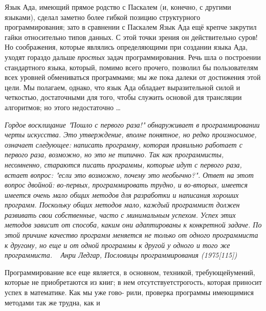 Язык Ада, имеющий прямое родство с Паскалем (и, конечно, с другими языками), сделал заметно более гибкой позицию структурного программирования; зато в сравнении с Паскалем Язык Ада ещё крепче закрутил гайки относительно типов данных. С этой точки зрения он действительно суров! Но соображения, которые являлись определяющими при создании языка Ада, уходят гораздо дальше \textit{простых} задач программирования. Речь шла о построении стандартного языка, который, помимо всего прочего, позволил бы пользователям всех уровней обмениваться программами; мы же пока далеки от достижения этой цели. Мы полагаем, однако, что язык Ада обладает выразительной силой и четкостью, достаточными для того, чтобы служить основой для трансляции алгоритмов; но этого недостаточно \dots
\begin{flushright}


\parbox{11.5cm}{ 
\textit{\hspace*{15pt}Гордое восклицание "Пошло с первого раза!" обнаруживает в программировании черты искусства. Это утверждение, вполне понятное, но редко произносимое, означает следующее: написать программу, которая правильно работает с первого раза, возможно, но это не типично. Так как программисты, несомненно, стараются писать программы, которые идут с первого раза, встает вопрос: "если это возможно, почему это необычно?". Ответ  на этот вопрос двойной: во-первых, программировать трудно, и во-вторых, имеется имеется очень мало общих методов для разработки и написания хороших программ. Поскольку общих методов мало, каждый программист должен развивать свои собственные, часто с минимальным успехом. Успех этих методов зависит от способа, каким они адаптированы к конкретной задаче. По этой причине качество программ меняется не только от одного программиста к другому, но еще и от одной программы к другой у одного и того же программиста.}\newline
\ \newline
               \textit{Анри Ледгар, Пословицы программирования (1975[115])}
}
\end{flushright}
Программирование все еще является, в основном, техникой, требующей\linebreak умений, которые не приобретаются из книг; в нем отсутствует\linebreak строгость, которая приносит успех в математике. Как мы уже гово-\linebreak
рили, проверка программы имеющимися методами так же трудна, как и

\newpage

